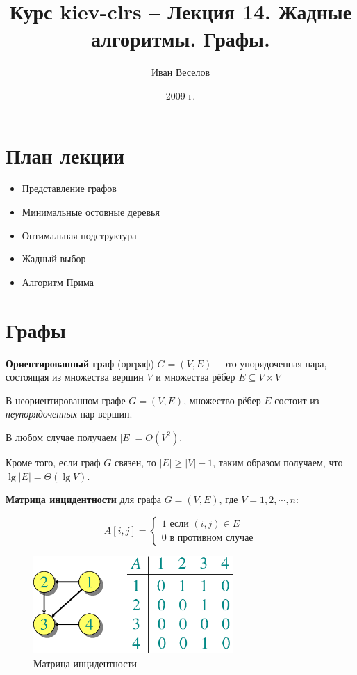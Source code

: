 \documentclass[a4paper,11pt]{article}
\author{Иван Веселов}
\title{Курс kiev-clrs -- Лекция 14. Жадные алгоритмы. Графы.}
\date{2009 г.}
\begin{document}
\maketitle
\tableofcontents
\newpage

\setlength{\parskip}{1ex plus 0.5ex minus 0.2ex}

\section{План лекции}
\begin{itemize}
\item Представление графов
\item Минимальные остовные деревья
\item Оптимальная подструктура
\item Жадный выбор
\item Алгоритм Прима
\end{itemize}

\section{Графы}

\textbf{Ориентированный граф} (орграф) $G = (V, E)$ -- это упорядоченная пара,
состоящая из множества вершин $V$ и множества рёбер $E \subseteq V \times V$

В неориентированном графе $G = (V, E)$, множество рёбер $E$ состоит из
\emph{неупорядоченных} пар вершин.

В любом случае получаем $|E| = O(V^2)$.

Кроме того, если граф $G$ связен, то $ |E| \geqslant |V| - 1$, таким образом получаем, что
$\lg |E| = \Theta(\lg V)$.

\textbf{Матрица инцидентности} для графа $G = (V, E)$, где $V = 1, 2, \cdots, n$:

$$
A[i, j] = \begin{cases}
  1 \text{ если } (i, j) \in E \\
  0 \text{ в противном случае}
\end{cases}
$$

\begin{figure}[ht]
  \centering
  \includegraphics[width=3in]{lecture16/adjacency-matrix.eps}
  \caption{Матрица инцидентности}
  \label{fig:adjacency}
\end{figure}
\end{document}
